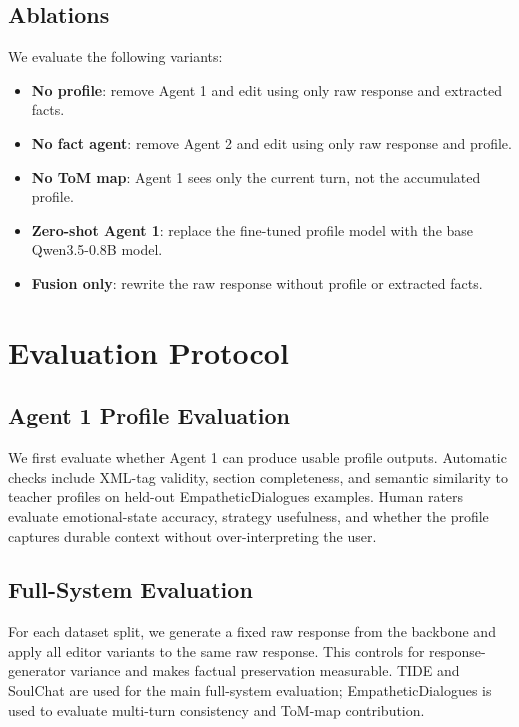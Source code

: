 \documentclass[11pt]{article}
\begin{document}
\subsection{Ablations}

We evaluate the following variants:

\begin{itemize}
    \item \textbf{No profile}: remove Agent 1 and edit using only raw response and extracted facts.
    \item \textbf{No fact agent}: remove Agent 2 and edit using only raw response and profile.
    \item \textbf{No ToM map}: Agent 1 sees only the current turn, not the accumulated profile.
    \item \textbf{Zero-shot Agent 1}: replace the fine-tuned profile model with the base Qwen3.5-0.8B model.
    \item \textbf{Fusion only}: rewrite the raw response without profile or extracted facts.
\end{itemize}

\section{Evaluation Protocol}
\label{sec:evaluation_protocol}

\subsection{Agent 1 Profile Evaluation}

We first evaluate whether Agent 1 can produce usable profile outputs. Automatic checks include XML-tag validity, section completeness, and semantic similarity to teacher profiles on held-out EmpatheticDialogues examples. Human raters evaluate emotional-state accuracy, strategy usefulness, and whether the profile captures durable context without over-interpreting the user.

\subsection{Full-System Evaluation}

For each dataset split, we generate a fixed raw response from the backbone and apply all editor variants to the same raw response. This controls for response-generator variance and makes factual preservation measurable. TIDE and SoulChat are used for the main full-system evaluation; EmpatheticDialogues is used to evaluate multi-turn consistency and ToM-map contribution.
\end{document}
